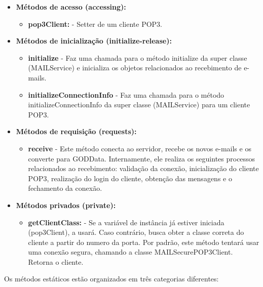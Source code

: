 \begin{itemize}
	\item \textbf{Métodos de acesso (accessing):}
	\begin{itemize}
		\item \textbf{pop3Client:} - Setter de um cliente POP3.
	\end{itemize}
	\item \textbf{Métodos de inicialização (initialize-release):}
	\begin{itemize}
		\item \textbf{initialize} - Faz uma chamada para o método initialize da super classe (MAILService) e inicializa os objetos relacionados ao recebimento de e-mails.
		\item \textbf{initializeConnectionInfo} - Faz uma chamada para o método initializeConnectionInfo da super classe (MAILService) para um cliente POP3.
	\end{itemize}
	\item \textbf{Métodos de requisição (requests):}
	\begin{itemize}
		\item \textbf{receive} - Este método conecta ao servidor, recebe os novos e-mails e os converte para GODData. Internamente, ele realiza os seguintes processos relacionados ao recebimento: validação da conexão, inicialização do cliente POP3, realização do login do cliente, obtenção das mensagens e o fechamento da conexão.
	\end{itemize}
	\item \textbf{Métodos privados (private):}
	\begin{itemize}
		\item \textbf{getClientClass:} - Se a variável de instância já estiver iniciada (pop3Client), a usará. Caso contrário, busca obter a classe correta do cliente a partir do numero da porta. Por padrão, este método tentará usar uma conexão segura, chamando a classe MAILSecurePOP3Client. Retorna o cliente.
	\end{itemize}
\end{itemize}

Os métodos estáticos estão organizados em três categorias diferentes:

